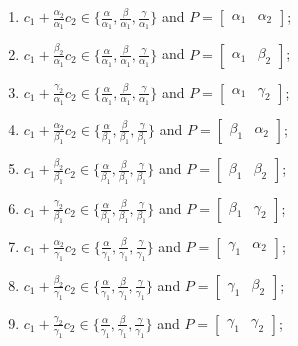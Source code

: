 
\begin{enumerate}
\item[(a1)] $c_1+\frac{\alpha_2}{\alpha_1} c_2\in \{\frac{\alpha}{\alpha_1},\frac{\beta}{\alpha_1},\frac{\gamma}{\alpha_1}\}$ and $P=\begin{bmatrix}\alpha_1&\alpha_2\end{bmatrix}$;
\item[(a2)] $c_1+\frac{\beta_2}{\alpha_1} c_2\in \{\frac{\alpha}{\alpha_1},\frac{\beta}{\alpha_1},\frac{\gamma}{\alpha_1}\}$ and $P=\begin{bmatrix}\alpha_1&\beta_2\end{bmatrix}$;
\item[(a3)] $c_1+\frac{\gamma_2}{\alpha_1} c_2\in \{\frac{\alpha}{\alpha_1},\frac{\beta}{\alpha_1},\frac{\gamma}{\alpha_1}\}$ and $P=\begin{bmatrix}\alpha_1&\gamma_2\end{bmatrix}$;
\item[(a4)] $c_1+\frac{\alpha_2}{\beta_1} c_2\in \{\frac{\alpha}{\beta_1},\frac{\beta}{\beta_1},\frac{\gamma}{\beta_1}\}$ and $P=\begin{bmatrix}\beta_1&\alpha_2\end{bmatrix}$;
\item[(a5)] $c_1+\frac{\beta_2}{\beta_1} c_2\in \{\frac{\alpha}{\beta_1},\frac{\beta}{\beta_1},\frac{\gamma}{\beta_1}\}$ and $P=\begin{bmatrix}\beta_1&\beta_2\end{bmatrix}$;
\item[(a6)] $c_1+\frac{\gamma_2}{\beta_1} c_2\in \{\frac{\alpha}{\beta_1},\frac{\beta}{\beta_1},\frac{\gamma}{\beta_1}\}$ and $P=\begin{bmatrix}\beta_1&\gamma_2\end{bmatrix}$;
\item[(a7)] $c_1+\frac{\alpha_2}{\gamma_1} c_2\in \{\frac{\alpha}{\gamma_1},\frac{\beta}{\gamma_1},\frac{\gamma}{\gamma_1}\}$ and $P=\begin{bmatrix}\gamma_1&\alpha_2\end{bmatrix}$;
\item[(a8)] $c_1+\frac{\beta_2}{\gamma_1} c_2\in \{\frac{\alpha}{\gamma_1},\frac{\beta}{\gamma_1},\frac{\gamma}{\gamma_1}\}$ and $P=\begin{bmatrix}\gamma_1&\beta_2\end{bmatrix}$;
\item[(a9)] $c_1+\frac{\gamma_2}{\gamma_1} c_2\in \{\frac{\alpha}{\gamma_1},\frac{\beta}{\gamma_1},\frac{\gamma}{\gamma_1}\}$ and $P=\begin{bmatrix}\gamma_1&\gamma_2\end{bmatrix}$;

\end{enumerate}
